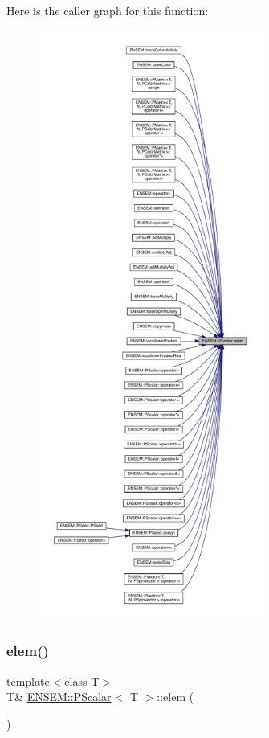 Here is the caller graph for this function\+:
\nopagebreak
\begin{figure}[H]
\begin{center}
\leavevmode
\includegraphics[height=550pt]{d3/d27/classENSEM_1_1PScalar_aac65f47beae4fa376f101587344c1589_icgraph}
\end{center}
\end{figure}
\mbox{\label{classENSEM_1_1PScalar_aac65f47beae4fa376f101587344c1589}} 
\subsubsection{\texorpdfstring{elem()}{elem()}\hspace{0.1cm}{\footnotesize\ttfamily [2/6]}}
{\footnotesize\ttfamily template$<$class T$>$ \\
T\& \mbox{\hyperlink{classENSEM_1_1PScalar}{E\+N\+S\+E\+M\+::\+P\+Scalar}}$<$ T $>$\+::elem (\begin{DoxyParamCaption}{ }\end{DoxyParamCaption})\hspace{0.3cm}{\ttfamily [inline]}}

